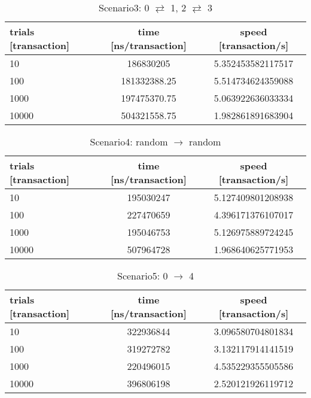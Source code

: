 \documentclass[a4j,11pt,uplatex,onecolumn]{article}
\begin{document}
\begin{table}[htb]
  \begin{center}
    \caption{Scenario3: 0 $\rightleftarrows$ 1, 2 $\rightleftarrows$ 3}
    \begin{tabular}{|l|c|c|} \hline
        trials [transaction] & time [ns/transaction] & speed [transaction/s]\\ \hline \hline
        10 & 186830205 & 5.352453582117517 \\
        100 & 181332388.25 & 5.514734624359088 \\
        1000 & 197475370.75 & 5.063922636033334 \\
        10000 & 504321558.75 & 1.982861891683904 \\ \hline
    \end{tabular}
  \end{center}
\end{table}

\begin{table}[htb]
  \begin{center}
    \caption{Scenario4: random $\rightarrow$ random}
    \begin{tabular}{|l|c|c|} \hline
        trials [transaction] & time [ns/transaction] & speed [transaction/s]\\ \hline \hline
        10 & 195030247 & 5.127409801208938 \\
        100 & 227470659 & 4.396171376107017 \\
        1000 & 195046753 & 5.126975889724245 \\
        10000 & 507964728 & 1.968640625771953  \\ \hline
    \end{tabular}
  \end{center}
\end{table}

\begin{table}[htb]
  \begin{center}
    \caption{Scenario5: 0 $\rightarrow$ 4}
    \begin{tabular}{|l|c|c|} \hline
        trials [transaction] & time [ns/transaction] & speed [transaction/s]\\ \hline \hline
        10 & 322936844 & 3.096580704801834 \\
        100 & 319272782 & 3.132117914141519 \\
        1000 & 220496015 & 4.535229355505586 \\
        10000 & 396806198 & 2.520121926119712 \\ \hline
    \end{tabular}
  \end{center}
\end{table}
\end{document}
